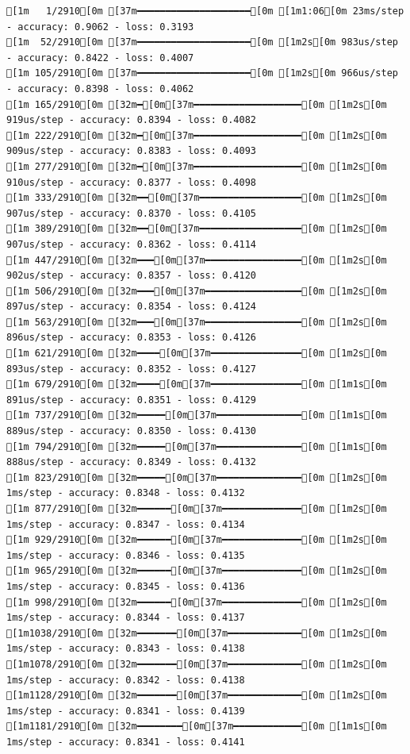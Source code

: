 \documentclass[
  letterpaper,
  DIV=11,
  numbers=noendperiod]{scrartcl}
\begin{document}
\begin{verbatim}
[1m   1/2910[0m [37m━━━━━━━━━━━━━━━━━━━━[0m [1m1:06[0m 23ms/step - accuracy: 0.9062 - loss: 0.3193
[1m  52/2910[0m [37m━━━━━━━━━━━━━━━━━━━━[0m [1m2s[0m 983us/step - accuracy: 0.8422 - loss: 0.4007 
[1m 105/2910[0m [37m━━━━━━━━━━━━━━━━━━━━[0m [1m2s[0m 966us/step - accuracy: 0.8398 - loss: 0.4062
[1m 165/2910[0m [32m━[0m[37m━━━━━━━━━━━━━━━━━━━[0m [1m2s[0m 919us/step - accuracy: 0.8394 - loss: 0.4082
[1m 222/2910[0m [32m━[0m[37m━━━━━━━━━━━━━━━━━━━[0m [1m2s[0m 909us/step - accuracy: 0.8383 - loss: 0.4093
[1m 277/2910[0m [32m━[0m[37m━━━━━━━━━━━━━━━━━━━[0m [1m2s[0m 910us/step - accuracy: 0.8377 - loss: 0.4098
[1m 333/2910[0m [32m━━[0m[37m━━━━━━━━━━━━━━━━━━[0m [1m2s[0m 907us/step - accuracy: 0.8370 - loss: 0.4105
[1m 389/2910[0m [32m━━[0m[37m━━━━━━━━━━━━━━━━━━[0m [1m2s[0m 907us/step - accuracy: 0.8362 - loss: 0.4114
[1m 447/2910[0m [32m━━━[0m[37m━━━━━━━━━━━━━━━━━[0m [1m2s[0m 902us/step - accuracy: 0.8357 - loss: 0.4120
[1m 506/2910[0m [32m━━━[0m[37m━━━━━━━━━━━━━━━━━[0m [1m2s[0m 897us/step - accuracy: 0.8354 - loss: 0.4124
[1m 563/2910[0m [32m━━━[0m[37m━━━━━━━━━━━━━━━━━[0m [1m2s[0m 896us/step - accuracy: 0.8353 - loss: 0.4126
[1m 621/2910[0m [32m━━━━[0m[37m━━━━━━━━━━━━━━━━[0m [1m2s[0m 893us/step - accuracy: 0.8352 - loss: 0.4127
[1m 679/2910[0m [32m━━━━[0m[37m━━━━━━━━━━━━━━━━[0m [1m1s[0m 891us/step - accuracy: 0.8351 - loss: 0.4129
[1m 737/2910[0m [32m━━━━━[0m[37m━━━━━━━━━━━━━━━[0m [1m1s[0m 889us/step - accuracy: 0.8350 - loss: 0.4130
[1m 794/2910[0m [32m━━━━━[0m[37m━━━━━━━━━━━━━━━[0m [1m1s[0m 888us/step - accuracy: 0.8349 - loss: 0.4132
[1m 823/2910[0m [32m━━━━━[0m[37m━━━━━━━━━━━━━━━[0m [1m2s[0m 1ms/step - accuracy: 0.8348 - loss: 0.4132  
[1m 877/2910[0m [32m━━━━━━[0m[37m━━━━━━━━━━━━━━[0m [1m2s[0m 1ms/step - accuracy: 0.8347 - loss: 0.4134
[1m 929/2910[0m [32m━━━━━━[0m[37m━━━━━━━━━━━━━━[0m [1m2s[0m 1ms/step - accuracy: 0.8346 - loss: 0.4135
[1m 965/2910[0m [32m━━━━━━[0m[37m━━━━━━━━━━━━━━[0m [1m2s[0m 1ms/step - accuracy: 0.8345 - loss: 0.4136
[1m 998/2910[0m [32m━━━━━━[0m[37m━━━━━━━━━━━━━━[0m [1m2s[0m 1ms/step - accuracy: 0.8344 - loss: 0.4137
[1m1038/2910[0m [32m━━━━━━━[0m[37m━━━━━━━━━━━━━[0m [1m2s[0m 1ms/step - accuracy: 0.8343 - loss: 0.4138
[1m1078/2910[0m [32m━━━━━━━[0m[37m━━━━━━━━━━━━━[0m [1m2s[0m 1ms/step - accuracy: 0.8342 - loss: 0.4138
[1m1128/2910[0m [32m━━━━━━━[0m[37m━━━━━━━━━━━━━[0m [1m2s[0m 1ms/step - accuracy: 0.8341 - loss: 0.4139
[1m1181/2910[0m [32m━━━━━━━━[0m[37m━━━━━━━━━━━━[0m [1m1s[0m 1ms/step - accuracy: 0.8341 - loss: 0.4141

\end{verbatim}
\end{document}
